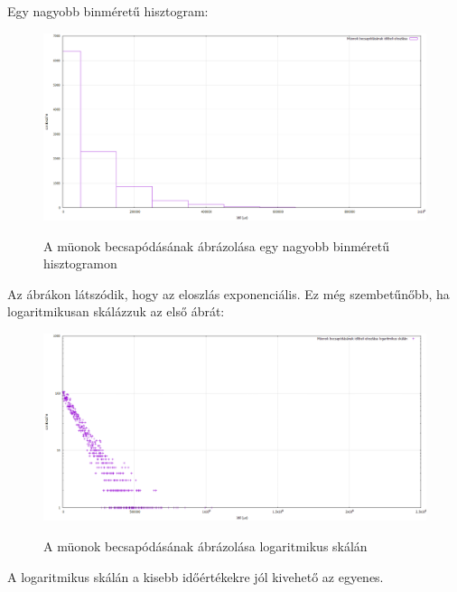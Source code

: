 \documentclass[a4paper,11pt]{article}
\begin{document}
\pagebreak
Egy nagyobb binméretű hisztogram:
\begin{figure}[h]
{\centering \includegraphics[width=\linewidth]{histogram2.png}}
\caption{A müonok becsapódásának ábrázolása egy nagyobb binméretű hisztogramon}
\end{figure}

Az ábrákon látszódik, hogy az eloszlás exponenciális. Ez még szembetűnőbb, ha logaritmikusan skálázzuk az első ábrát:

\begin{figure}[h]
{\centering \includegraphics[width=\linewidth]{histogram3.png}}
\caption{A müonok becsapódásának ábrázolása logaritmikus skálán}
\end{figure}

A logaritmikus skálán a kisebb időértékekre jól kivehető az egyenes.
\end{document}
